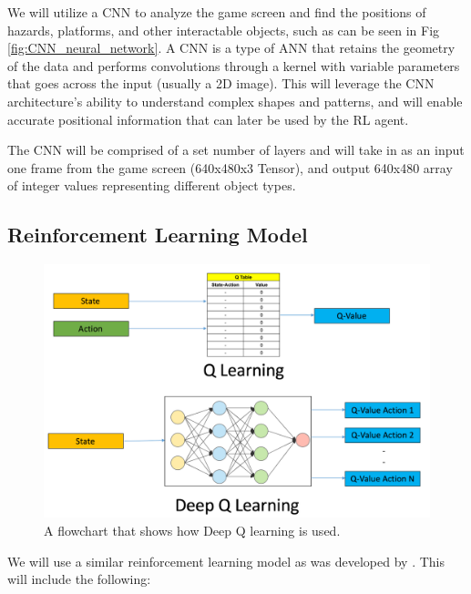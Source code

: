 \documentclass{article} %
\begin{document}
We will utilize a CNN to analyze the game screen and find the positions of hazards, platforms, and other interactable objects, such as can be seen in Fig \ref{fig:CNN_neural_network}. A CNN is a type of ANN that retains the geometry of the data and performs convolutions through a kernel with variable parameters that goes across the input (usually a 2D image). This will leverage the CNN architecture’s ability to understand complex shapes and patterns, and will enable accurate positional information that can later be used by the RL agent.

The CNN will be comprised of a set number of layers and will take in as an
input one frame from the game screen (640x480x3 Tensor), and output 
640x480 array of integer values representing different object types.
 

\subsection{Reinforcement Learning Model}

\begin{figure}[!htbp]
\begin{center}
\includegraphics[width=1.0\textwidth]{Figs/QLearn_img.png}
\end{center}
\caption{A flowchart that shows how Deep Q learning is used.}
\label{fig:Deep_Q_Learn}
\end{figure}

We will use a similar reinforcement learning model as was developed by 
\cite{Playing+Atari+with+Deep+Reinforcement+Learning}. This will include
the following:
\end{document}
